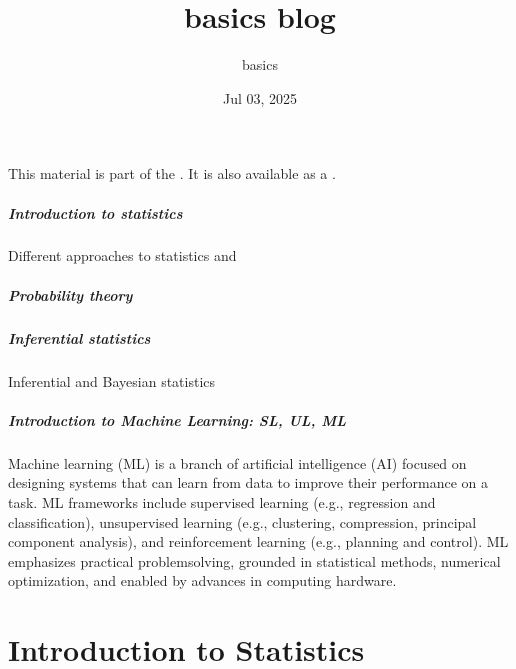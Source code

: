 \documentclass[letterpaper,10pt,english]{jupyterBook}
\title{basics blog}
\date{Jul 03, 2025}
\author{basics}
\begin{document}
\pagestyle{empty}
\sphinxmaketitle
\pagestyle{plain}
\sphinxtableofcontents
\pagestyle{normal}
\label{\detokenize{intro::doc}}


\sphinxAtStartPar
This material is part of the . It is also available as a .

\sphinxAtStartPar
{}
\subsubsection*{Introduction to statistics}

\sphinxAtStartPar
Different approaches to statistics and 
\subsubsection*{Probability theory}
\subsubsection*{Inferential statistics}

\sphinxAtStartPar
Inferential and Bayesian statistics
\subsubsection*{Introduction to Machine Learning: SL, UL, ML}

\sphinxAtStartPar
Machine learning (ML) is a branch of artificial intelligence (AI) focused on designing systems that can learn from data to improve their performance on a task. ML frameworks include supervised learning (e.g., regression and classification), unsupervised learning (e.g., clustering, compression, principal component analysis), and reinforcement learning (e.g., planning and control). ML emphasizes practical problem\sphinxhyphen{}solving, grounded in statistical methods, numerical optimization, and enabled by advances in computing hardware.





\sphinxstepscope


\part{Introduction to Statistics}

\sphinxstepscope
\end{document}
